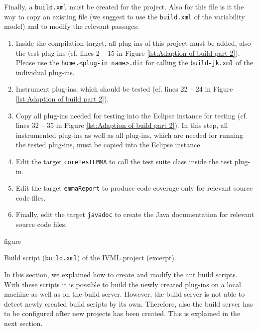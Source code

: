 Finally, a \texttt{build.xml} must be created for the project. Also for this file is it the way to copy an existing file (we suggest to use the \texttt{build.xml} of the variability model) and to modify the relevant passages:
\begin{enumerate}
	\item Inside the compilation target, all plug-ins of this project must be added, also the test plug-ins (cf. lines 2 -- 15 in Figure \vref{lst:Adaption of build part 2}). Please use the \texttt{home.<plug-in name>.dir} for calling the \texttt{build-jk.xml} of the individual plug-ins.
	\item Instrument plug-ins, which should be tested (cf. lines 22 -- 24 in Figure \vref{lst:Adaption of build part 2}).
	\item Copy all plug-ins needed for testing into the Eclipse instance for testing (cf. lines 32 -- 35 in Figure \vref{lst:Adaption of build part 2}). In this step, all instrumented plug-ins as well as all plug-ins, which are needed for running the tested plug-ins, must be copied into the Eclipse instance.
	\item Edit the target \texttt{coreTestEMMA} to call the test suite class inside the test plug-in.
	\item Edit the target \texttt{emmaReport} to produce code coverage only for relevant source code files.
	\item Finally, edit the target \texttt{javadoc} to create the Java documentation for relevant source code files.
\end{enumerate}

\newpage
\begin{nofloat}{figure}
	\centering
	
	\caption[Build script of the IVML project (compile, instrument, copy targets)]{Build script (\texttt{build.xml}) of the IVML project (excerpt).}
	\label{lst:Adaption of build part 2}
\end{nofloat}

In this section, we explained how to create and modify the ant build scripts. With these scripts it is possible to build the newly created plug-ins on a local machine as well as on the build server. However, the build server is not able to detect newly created build scripts by its own. Therefore, also the build server has to be configured after new projects has been created. This is explained in the next section.

